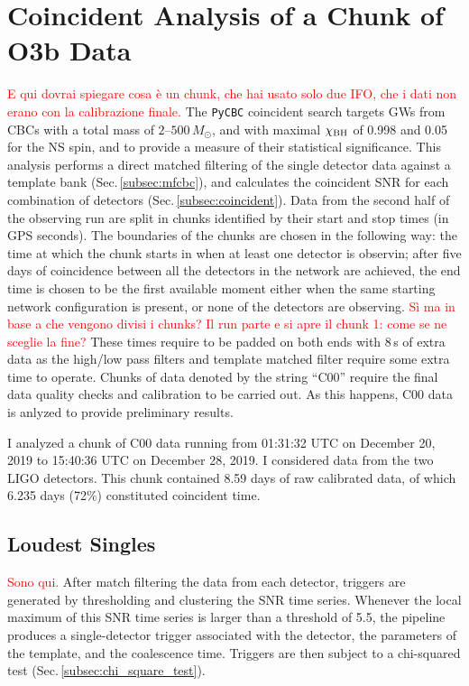 \documentclass[binding=0.6cm, LaM]{sapthesis}
\newcommand{\fpg}[1]{\textcolor{red}{#1} }
\begin{document}
\section{Coincident Analysis of a Chunk of O3b Data}
\label{sec:pycbc00}
\fpg{E qui dovrai spiegare cosa \`e un chunk, che hai usato solo due IFO, che i dati non erano con la calibrazione finale.}
	The {\texttt{PyCBC}} coincident search targets GWs from CBCs with a total mass of $2$--$500\,M_\odot$,
        and with maximal $\chi_{\rm BH}$ of 0.998 and 0.05 for the NS spin,
        and to provide a measure of their statistical significance.
        This analysis performs a direct matched filtering of the single detector data against a template bank (Sec.\,\ref{subsec:mfcbc}),
        and calculates the coincident SNR for each combination of detectors (Sec.\,\ref{subsec:coincident}).
	Data from the second half of the observing run are split in chunks
	identified by their start and stop times (in GPS seconds).
	The boundaries of the chunks are chosen in the following way:
	the time at which the chunk starts in when at least one detector is observin;
	after five days of coincidence between all the detectors in the network are achieved,
	the end time is chosen to be the first available moment either when the same starting network configuration is present,
	or none of the detectors are observing. \fpg{S\`i ma in base a che vengono divisi i chunks?  Il run parte e si apre il chunk 1: come se ne sceglie la fine?}
	These times require to be padded on both ends with 8\,s of extra data 	
	as the high/low pass filters and template matched filter require some extra time to operate.
	Chunks of data denoted by the string ``C00'' require the final data quality checks and calibration to be carried out.
        As this happens, C00 data is anlyzed to provide preliminary results.

        I analyzed a chunk of C00 data running from 01:31:32 UTC on December 20, 2019 to 15:40:36 UTC on December 28, 2019.  I considered data from the two LIGO detectors.  This chunk contained 8.59 days of raw calibrated data,
        of which 6.235 days (72\%) constituted coincident time.

\subsection{Loudest Singles}
\fpg{Sono qui.}
	After match filtering the data from each detector,
	triggers are generated by thresholding and clustering the SNR time series. 
        Whenever the local maximum of this SNR time series is larger than a threshold of 5.5,
        the pipeline produces a single-detector trigger associated with the detector,
        the parameters of the template, and the coalescence time.
	Triggers are then subject to a chi-squared test (Sec.\,\ref{subsec:chi_square_test}).
\end{document}

